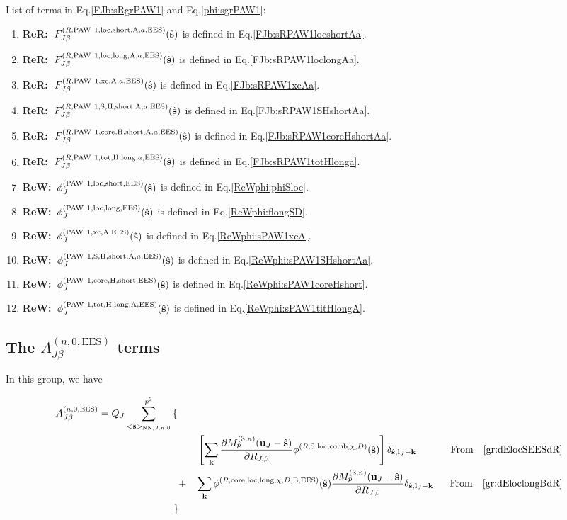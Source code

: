 \documentclass[paper=a4, fontsize=11pt]{article} %
\numberwithin{equation}{section} %
\numberwithin{figure}{section} %
\numberwithin{table}{section} %
\newcommand{\p}{\partial}
\newcommand{\bu}{{\bf{u}}}
\newcommand{\bl}{{\bf{l}}}
\newcommand{\bk}{{\bf{k}}}
\newcommand{\bs}{{\bf{s}}}
\newcommand{\hs}{{\hat{\bf{s}}}}
\newcommand{\rS}{{\mathrm{S}}}
\newcommand{\rEES}{{\mathrm{EES}}}
\newcommand{\rxc}{{\mathrm{xc}}}
\newcommand{\rcore}{{\mathrm{core}}}
\newcommand{\rNN}{{\mathrm{NN}}}
\newcommand{\rshort}{{\mathrm{short}}}
\newcommand{\rlong}{{\mathrm{long}}}
\newcommand{\rP}{{\mathrm{PAW}}}
\newcommand{\rH}{{\mathrm{H}}}
\newcommand{\rA}{{\mathrm{A}}}
\newcommand{\rB}{{\mathrm{B}}}
\newcommand{\rcomb}{{\mathrm{comb}}}
\newcommand{\rlo}{{\mathrm{loc}}}
\newcommand{\rtot}{{\mathrm{tot}}}
\newcommand{\RJb}{{R_{J,\beta}}}
\newcommand{\Mn}{{M_p^{(3,n)}}}
\newcommand{\hsJnzr}{{<\hs>_{\rNN,J,n,0}}}
\newcommand{\fr}{{\nonumber \ \ \ \ \ \mathrm{From}\ \ \ }}
\newcommand{\ReW}{{{\bf ReW:\ }}}
\newcommand{\ReR}{{{\bf ReR:\ }}}
\begin{document}
List of terms in Eq.\eqref{FJb:sRgrPAW1} and Eq.\eqref{phi:sgrPAW1}:
\begin{enumerate}
\item \ReR $F_{J\beta}^{(R,\rP\ 1,\rlo,\rshort,\rA,a,\rEES)}(\hs)$ is defined in Eq.\eqref{FJb:sRPAW1locshortAa}.
\item \ReR $F_{J\beta}^{(R,\rP\ 1,\rlo,\rlong,\rA,a,\rEES)}(\hs)$ is defined in Eq.\eqref{FJb:sRPAW1loclongAa}.
\item \ReR $F_{J\beta}^{(R,\rP\ 1,\rxc,\rA,a,\rEES)}(\hs)$ is defined in Eq.\eqref{FJb:sRPAW1xcAa}.
\item \ReR $F_{J\beta}^{(R,\rP\ 1,\rS,\rH,\rshort,\rA,a,\rEES)}(\hs)$ is defined in Eq.\eqref{FJb:sRPAW1SHshortAa}.
\item \ReR $F_{J\beta}^{(R,\rP\ 1,\rcore,\rH,\rshort,\rA,a,\rEES)}(\hs)$ is defined in Eq.\eqref{FJb:sRPAW1coreHshortAa}.
\item \ReR $F_{J\beta}^{(R,\rP\ 1,\rtot,\rH,\rlong,a,\rEES)}(\hs)$ is defined in Eq.\eqref{FJb:sRPAW1totHlonga}.
\item \ReW $\phi_J^{(\rP\ 1,\rlo,\rshort,\rEES)}(\hs)$ is defined in Eq.\eqref{ReWphi:phiSloc}.
\item \ReW $\phi_J^{(\rP\ 1,\rlo,\rlong,\rEES)}(\hs)$ is defined in Eq.\eqref{ReWphi:flongSD}.
\item \ReW $\phi_J^{(\rP\ 1,\rxc,\rA,\rEES)}(\hs)$ is defined in Eq.\eqref{ReWphi:sPAW1xcA}.
\item \ReW $\phi_J^{(\rP\ 1,\rS,\rH,\rshort,\rA,a,\rEES)}(\hs)$ is defined in Eq.\eqref{ReWphi:sPAW1SHshortAa}.
\item \ReW $\phi_J^{(\rP\ 1,\rcore,\rH,\rshort,\rEES)}(\hs)$ is defined in Eq.\eqref{ReWphi:sPAW1coreHshort}.
\item \ReW $\phi_J^{(\rP\ 1,\rtot,\rH,\rlong,\rA,\rEES)}(\hs)$ is defined in Eq.\eqref{ReWphi:sPAW1titHlongA}.
\end{enumerate}


\subsection{The $A_{J\beta}^{(n,0,\rEES)}$ terms}

In this group, we have

\begin{eqnarray}
A_{J\beta}^{(n,0,\rEES)} = Q_J 
 \sum_{\hsJnzr}^{p^3} \left\{ \right. &&  \nonumber \\
&&\left. \left[ \sum_{\bk} \frac{\p M_p^{(3,n)}(\bu_{J}-\hat \bs)}{\p \RJb} \phi^{(R,\rS,\rlo,\rcomb,\chi,D)}(\hs)\right]\delta_{\hs,\bl_J-\bk} \hspace*{0.25in}\fr \eqref{gr:dElocSEESdR} \right. \\
&+& \left.  \sum_{\bk} \phi^{(R,\rcore,\rlo,\rlong,\chi,D,\rB,\rEES)}(\hs) \frac{\p \Mn (\bu_{J}-\hat \bs)}{\p \RJb} \delta_{\hs,\bl_J-\bk}  \fr \eqref{gr:dEloclongBdR} \right. \\
\left. \right\} &&
\end{eqnarray}
\end{document}
